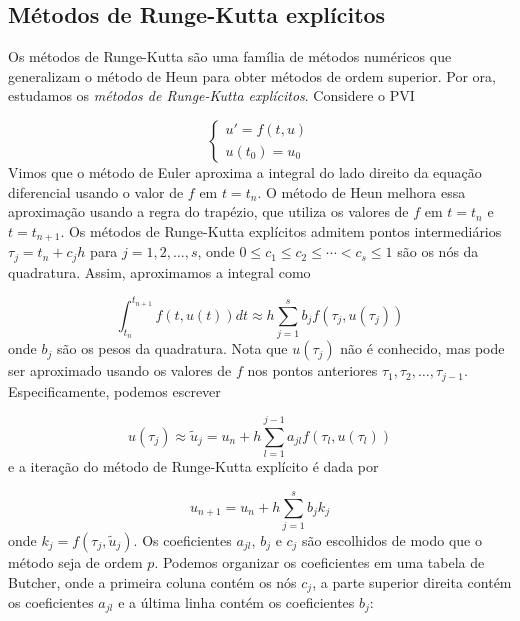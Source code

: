 \documentclass{article}
\begin{document}
\subsection{Métodos de Runge-Kutta explícitos}

Os métodos de Runge-Kutta são uma família de métodos numéricos que generalizam o método de Heun para obter métodos de ordem superior. Por ora, estudamos os \emph{métodos de Runge-Kutta explícitos}. Considere o PVI

\begin{equation}
    \begin{cases}
        u' = f(t, u) \\
        u(t_0) = u_0
    \end{cases}
\end{equation}
Vimos que o método de Euler aproxima a integral do lado direito da equação diferencial usando o valor de \(f\) em \(t = t_n\). O método de Heun melhora essa aproximação usando a regra do trapézio, que utiliza os valores de \(f\) em \(t = t_n\) e \(t = t_{n+1}\). Os métodos de Runge-Kutta explícitos admitem pontos intermediários \(\tau_j = t_n + c_j h\) para \(j = 1, 2, \ldots, s\), onde \(0 \leq c_1 \leq c_2 \leq \cdots < c_s \leq 1\) são os nós da quadratura. Assim, aproximamos a integral como

\begin{equation}
    \int_{t_n}^{t_{n+1}} f(t, u(t)) dt \approx h \sum_{j=1}^{s} b_j f(\tau_j, u(\tau_j))
\end{equation}
onde \(b_j\) são os pesos da quadratura. Nota que \(u(\tau_j)\) não é conhecido, mas pode ser aproximado usando os valores de \(f\) nos pontos anteriores \(\tau_1, \tau_2, \ldots, \tau_{j-1}\). Especificamente, podemos escrever

\begin{equation}
    u(\tau_j) \approx \tilde{u}_j = u_n + h \sum_{l=1}^{j-1} a_{jl} f(\tau_l, u(\tau_l))
\end{equation}
e a iteração do método de Runge-Kutta explícito é dada por

\begin{equation}
    u_{n+1} = u_n + h \sum_{j=1}^{s} b_j k_j
\end{equation}
onde \(k_j = f(\tau_j, \tilde{u}_j)\). Os coeficientes \(a_{jl}\), \(b_j\) e \(c_j\) são escolhidos de modo que o método seja de ordem \(p\). Podemos organizar os coeficientes em uma tabela de Butcher, onde a primeira coluna contém os nós \(c_j\), a parte superior direita contém os coeficientes \(a_{jl}\) e a última linha contém os coeficientes \(b_j\):
\end{document}
